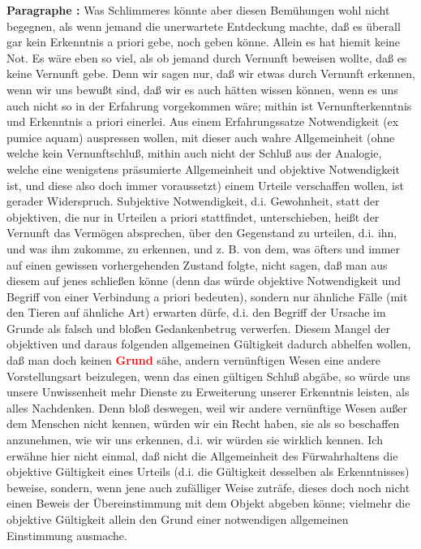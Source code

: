 \documentclass[a4paper,12pt,twoside]{book}
\newcommand{\match}[1]{\textcolor{red}{\textbf{#1}}}
\begin{document}
	\noindent\textbf{Paragraphe : }Was Schlimmeres könnte aber diesen Bemühungen wohl nicht begegnen, als wenn jemand die unerwartete Entdeckung machte, daß es überall gar kein Erkenntnis a priori gebe, noch geben könne. Allein es hat hiemit keine Not. Es wäre eben so viel, als ob jemand durch Vernunft beweisen wollte, daß es keine Vernunft gebe. Denn wir sagen nur, daß wir etwas durch Vernunft erkennen, wenn wir uns bewußt sind, daß wir es auch hätten wissen können, wenn es uns auch nicht so in der Erfahrung vorgekommen wäre; mithin ist Vernunfterkenntnis und Erkenntnis a priori einerlei. Aus einem Erfahrungssatze Notwendigkeit (ex pumice aquam) auspressen wollen, mit dieser auch wahre Allgemeinheit (ohne welche kein Vernunftschluß, mithin auch nicht der Schluß aus der Analogie, welche eine wenigstens präsumierte Allgemeinheit und objektive Notwendigkeit ist, und diese also doch immer voraussetzt) einem Urteile verschaffen wollen, ist gerader Widerspruch. Subjektive Notwendigkeit, d.i. Gewohnheit, statt der objektiven, die nur in Urteilen a priori stattfindet, unterschieben, heißt der Vernunft das Vermögen absprechen, über den Gegenstand zu urteilen, d.i. ihn, und was ihm zukomme, zu erkennen, und z. B. von dem, was öfters und immer auf einen gewissen vorhergehenden Zustand folgte, nicht sagen, daß man aus diesem auf jenes schließen könne (denn das würde objektive Notwendigkeit und Begriff von einer Verbindung a priori bedeuten), sondern nur ähnliche Fälle (mit den Tieren auf ähnliche Art) erwarten dürfe, d.i. den Begriff der Ursache im Grunde als  falsch und bloßen Gedankenbetrug verwerfen. Diesem Mangel der objektiven und daraus folgenden allgemeinen Gültigkeit dadurch abhelfen wollen, daß man doch keinen \match{Grund} sähe, andern vernünftigen Wesen eine andere Vorstellungsart beizulegen, wenn das einen gültigen Schluß abgäbe, so würde uns unsere Unwissenheit mehr Dienste zu Erweiterung unserer Erkenntnis leisten, als alles Nachdenken. Denn bloß deswegen, weil wir andere vernünftige Wesen außer dem Menschen nicht kennen, würden wir ein Recht haben, sie als so beschaffen anzunehmen, wie wir uns erkennen, d.i. wir würden sie wirklich kennen. Ich erwähne hier nicht einmal, daß nicht die Allgemeinheit des Fürwahrhaltens die objektive Gültigkeit eines Urteils (d.i. die Gültigkeit desselben als Erkenntnisses) beweise, sondern, wenn jene auch zufälliger Weise zuträfe, dieses doch noch nicht einen Beweis der Übereinstimmung mit dem Objekt abgeben könne; vielmehr die objektive Gültigkeit allein den Grund einer notwendigen allgemeinen Einstimmung ausmache. 
	
\end{document}
